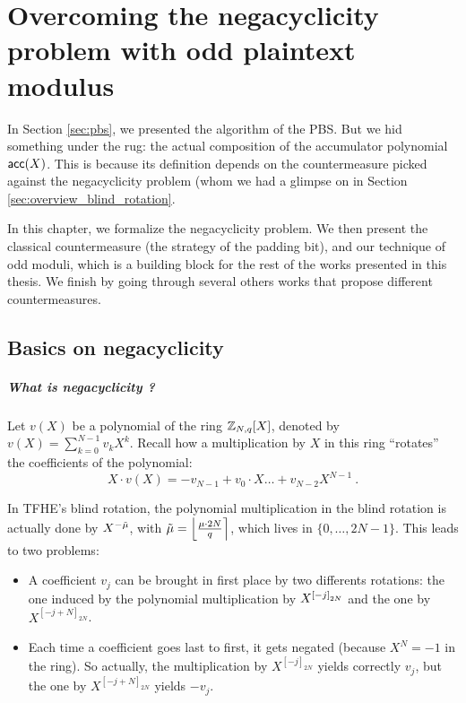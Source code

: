 
\chapter{Overcoming the negacyclicity problem with odd plaintext modulus}
\label{chap:negacyclicity}

In Section \ref{sec:pbs}, we presented the algorithm of the PBS. But we hid something under the rug: the actual composition of the accumulator polynomial $\textsf{acc}(X)$. This is because its definition depends on the countermeasure picked against the negacyclicity problem (whom we had a glimpse on  in Section \ref{sec:overview_blind_rotation}. 


In this chapter, we formalize the negacyclicity problem. We then present the classical countermeasure (the strategy of the padding bit), and our technique of odd moduli, which is a building block for the rest of the works presented in this thesis. We finish by going through several others works that propose different countermeasures.




\section{Basics on negacyclicity}

\paragraph{What is negacyclicity ?}

Let $v(X)$ be a polynomial of the ring $\mathbb{Z}_{N,q}[X]$, denoted by $v(X) = \sum_{k=0}^{N-1} v_k X^k$. Recall how a multiplication by $X$  in this ring ``rotates'' the coefficients of the polynomial: \[X \cdot v(X) = - v_{N - 1} + v_0 \cdot X \dots + v_{N - 2} X^{N - 1}~.\]

In TFHE's blind rotation, the polynomial multiplication in the blind rotation is actually done by $X^{-\Tilde{\mu}}$, with $\Tilde{\mu} = \left \lfloor \frac{\mu \cdot 2N}{q} \right \rceil$, which lives in $\{0, \dots, 2N - 1\}$. This leads to two problems:

\begin{itemize}
	\item A coefficient $v_j$ can be brought in first place by two differents rotations: the one induced by the polynomial multiplication by $X^{\left [ -j \right ]_{2N}}$ and the one by $X^{[-j + N]_{2N}}$.
	\item Each time a coefficient goes last to first, it gets negated (because $X^N = -1$ in the ring). So actually, the multiplication by $X^{[-j]_{2N}}$ yields correctly $v_j$, but the one by $X^{[-j + N]_{2N}}$ yields $-v_j$.
\end{itemize}


